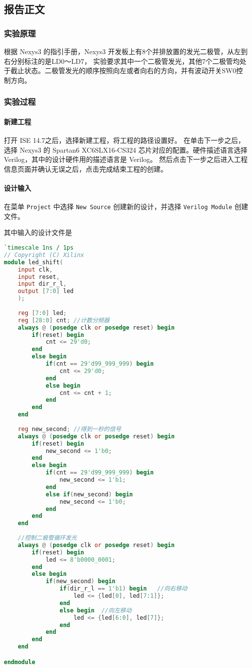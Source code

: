 \documentclass{ctexart}
\begin{document}
        \subsection{报告正文}

        \subsubsection{实验原理}
        
        根据 Nexys3 的指引手册，Nexys3 开发板上有8个并排放置的发光二极管，从左到右分别标注的是LD0～LD7，
        实验要求其中一个二极管发光，其他7个二极管均处于截止状态。二极管发光的顺序按照向左或者向右的方向，并有波动开关SW0控制方向。
        
        \subsubsection{实验过程}

        \paragraph{新建工程}

        打开 ISE 14.7之后，选择新建工程，将工程的路径设置好。
        在单击下一步之后，选择 Nexys3 的 Spartan6 XC6SLX16-CS324 芯片对应的配置。硬件描述语言选择 Verilog，其中的设计硬件用的描述语言是 Verilog。
        然后点击下一步之后进入工程信息页面并确认无误之后，点击完成结束工程的创建。

        \paragraph{设计输入}

        在菜单 \verb|Project| 中选择 \verb|New Source| 创建新的设计，并选择 \verb|Verilog Module| 创建文件。
        
        其中输入的设计文件是
\begin{lstlisting}[language=Verilog]
`timescale 1ns / 1ps
// Copyright (C) Xilinx
module led_shift(
    input clk,
    input reset,
    input dir_r_l,
    output [7:0] led
    );
	 
	reg [7:0] led;
	reg [28:0] cnt;	//计数分频器
	always @ (posedge clk or posedge reset) begin
		if(reset) begin
			cnt <= 29'd0;
		end
		else begin
			if(cnt == 29'd99_999_999) begin
				cnt <= 29'd0;
			end
			else begin
				cnt <= cnt + 1;
			end
		end
	end
	
	reg new_second;	//得到一秒的信号
	always @ (posedge clk or posedge reset) begin
		if(reset) begin
			new_second <= 1'b0;
		end
		else begin
			if(cnt == 29'd99_999_999) begin
				new_second <= 1'b1;
			end
			else if(new_second) begin
				new_second <= 1'b0;
			end
		end
	end
	
	//控制二极管循环发光
	always @ (posedge clk or posedge reset) begin
		if(reset) begin	
			led <= 8'b0000_0001;
		end
		else begin
			if(new_second) begin
				if(dir_r_l == 1'b1) begin	//向右移动
					led <= {led[0], led[7:1]};
				end
				else begin	//向左移动
					led <= {led[6:0], led[7]};
				end
			end
		end
	end

endmodule
\end{lstlisting}
\end{document}

